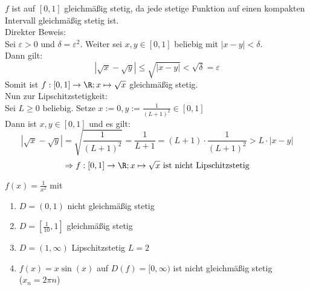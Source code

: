\documentclass[../ana1u.tex]{subfiles}
\begin{document}
\begin{bew}
    \(f \) ist auf \([0,1] \) gleichmäßig stetig, da jede stetige Funktion auf einen kompakten Intervall
    gleichmäßig stetig ist. \\
    Direkter Beweis: \\
    Sei \(\varepsilon > 0 \) und \(\delta = \varepsilon^2 \). Weiter sei \(x,y \in [0,1] \) beliebig mit
    \(|x-y| < \delta \). \\
    Dann gilt:
    \[|\sqrt{x}-\sqrt{y}| \leq \sqrt{|x-y|} < \sqrt{\delta} = \varepsilon \]
    Somit ist \(f:[0,1] \rightarrow \R; x \mapsto \sqrt{x} \) gleichmäßig stetig. \\
    Nun zur Lipschitzstetigkeit: \\
    Sei \(L \geq 0 \) beliebig. Setze \(x := 0, y := \frac{1}{(L+1)^2} \in [0,1] \) \\
    Dann ist \(x,y \in [0,1] \) und es gilt:
    \[|\sqrt{x}-\sqrt{y}| = \sqrt{\frac{1}{(L+1)^2}} = \frac{1}{L+1} = (L+1) \cdot \frac{1}{(L+1)^2}
    > L \cdot |x-y| \]
    \[\Rightarrow f:[0,1] \rightarrow \R; x \mapsto \sqrt{x} \text{ ist nicht Lipschitzstetig} \]
\end{bew}
\begin{bsp}
    \(f(x) = \frac{1}{x^2} \) mit
    \begin{enumerate}
        \item \(D = (0,1) \) nicht gleichmäßig stetig
        \item \(D = \left[\frac{1}{10}, 1\right] \) gleichmäßig stetig
        \item \(D = (1,\infty) \) Lipschitzstetig \(L=2 \)
        \item \(f(x) = x \sin(x) \) auf \(D(f) = [0, \infty) \) ist nicht gleichmäßig stetig \\
            (\(x_n = 2 \pi n \))
    \end{enumerate}
\end{bsp}
\end{document}

